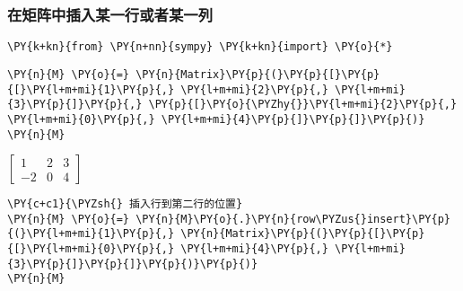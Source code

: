     \hypertarget{ux5728ux77e9ux9635ux4e2dux63d2ux5165ux67d0ux4e00ux884cux6216ux8005ux67d0ux4e00ux5217}{%
\subsubsection{在矩阵中插入某一行或者某一列}\label{ux5728ux77e9ux9635ux4e2dux63d2ux5165ux67d0ux4e00ux884cux6216ux8005ux67d0ux4e00ux5217}}

    \begin{tcolorbox}[breakable, size=fbox, boxrule=1pt, pad at break*=1mm,colback=cellbackground, colframe=cellborder]
\begin{Verbatim}[commandchars=\\\{\}]
\PY{k+kn}{from} \PY{n+nn}{sympy} \PY{k+kn}{import} \PY{o}{*}
\end{Verbatim}
\end{tcolorbox}

    \begin{tcolorbox}[breakable, size=fbox, boxrule=1pt, pad at break*=1mm,colback=cellbackground, colframe=cellborder]
\begin{Verbatim}[commandchars=\\\{\}]
\PY{n}{M} \PY{o}{=} \PY{n}{Matrix}\PY{p}{(}\PY{p}{[}\PY{p}{[}\PY{l+m+mi}{1}\PY{p}{,} \PY{l+m+mi}{2}\PY{p}{,} \PY{l+m+mi}{3}\PY{p}{]}\PY{p}{,} \PY{p}{[}\PY{o}{\PYZhy{}}\PY{l+m+mi}{2}\PY{p}{,} \PY{l+m+mi}{0}\PY{p}{,} \PY{l+m+mi}{4}\PY{p}{]}\PY{p}{]}\PY{p}{)}
\PY{n}{M}
\end{Verbatim}
\end{tcolorbox}
 
            
    
    $\displaystyle \left[\begin{matrix}1 & 2 & 3\\-2 & 0 & 4\end{matrix}\right]$

    

    \begin{tcolorbox}[breakable, size=fbox, boxrule=1pt, pad at break*=1mm,colback=cellbackground, colframe=cellborder]
\begin{Verbatim}[commandchars=\\\{\}]
\PY{c+c1}{\PYZsh{} 插入行到第二行的位置}
\PY{n}{M} \PY{o}{=} \PY{n}{M}\PY{o}{.}\PY{n}{row\PYZus{}insert}\PY{p}{(}\PY{l+m+mi}{1}\PY{p}{,} \PY{n}{Matrix}\PY{p}{(}\PY{p}{[}\PY{p}{[}\PY{l+m+mi}{0}\PY{p}{,} \PY{l+m+mi}{4}\PY{p}{,} \PY{l+m+mi}{3}\PY{p}{]}\PY{p}{]}\PY{p}{)}\PY{p}{)}
\PY{n}{M}
\end{Verbatim}
\end{tcolorbox}
 
